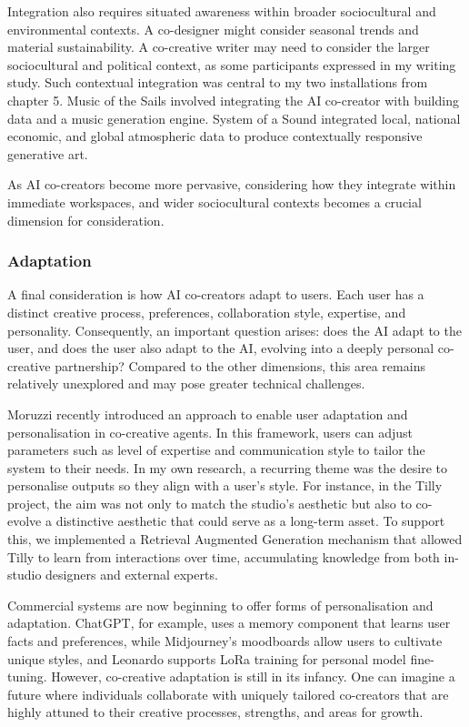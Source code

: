 Integration also requires situated awareness within broader sociocultural and environmental contexts. A co-designer might consider seasonal trends and material sustainability. A co-creative writer may need to consider the larger sociocultural and political context, as some participants expressed in my writing study. Such contextual integration was central to my two installations from chapter 5. Music of the Sails involved integrating the AI co-creator with building data and a music generation engine. System of a Sound integrated local, national economic, and global atmospheric data to produce contextually responsive generative art. 

As AI co-creators become more pervasive, considering how they integrate within immediate workspaces, and wider sociocultural contexts becomes a crucial dimension for consideration. 


\subsubsection{Adaptation}

A final consideration is how AI co-creators adapt to users. Each user has a distinct creative process, preferences, collaboration style, expertise, and personality. Consequently, an important question arises: does the AI adapt to the user, and does the user also adapt to the AI, evolving into a deeply personal co-creative partnership? Compared to the other dimensions, this area remains relatively unexplored and may pose greater technical challenges.

Moruzzi \cite{Moruzzi2024-cq} recently introduced an approach to enable user adaptation and personalisation in co-creative agents. In this framework, users can adjust parameters such as level of expertise and communication style to tailor the system to their needs. In my own research, a recurring theme was the desire to personalise outputs so they align with a user’s style. For instance, in the Tilly project, the aim was not only to match the studio’s aesthetic but also to co-evolve a distinctive aesthetic that could serve as a long-term asset. To support this, we implemented a Retrieval Augmented Generation mechanism that allowed Tilly to learn from interactions over time, accumulating knowledge from both in-studio designers and external experts.

Commercial systems are now beginning to offer forms of personalisation and adaptation. ChatGPT, for example, uses a memory component that learns user facts and preferences, while Midjourney’s moodboards allow users to cultivate unique styles, and Leonardo supports LoRa training for personal model fine-tuning. However, co-creative adaptation is still in its infancy. One can imagine a future where individuals collaborate with uniquely tailored co-creators that are highly attuned to their creative processes, strengths, and areas for growth.

